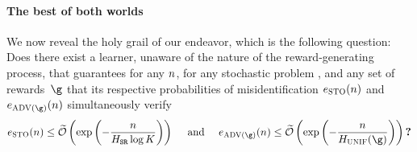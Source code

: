 \paragraph{The best of both worlds} We now reveal the holy grail of our endeavor, which is the following question: Does there exist 
a learner, unaware of the nature of the reward-generating process, that guarantees for any  $n$, for any stochastic problem 
\stoPro{}, and any set of rewards~$\gainVector$ that 
 its respective probabilities 
of misidentification $e_{\textsc{STO}}(n) $ and
$\ProErr_{\advPro(\gainVector)}(\timeHorizon) $ simultaneously verify 
\[
\ProErr_{\stoPro}(\timeHorizon) 
\leq
\tcO\left(\exp\left(-\frac{\timeHorizon}{\complexitySR\log\nArms}\right)\right)
\text{ ~~~and~~~ }
\ProErr_{\advPro(\gainVector)}(\timeHorizon) 
\leq  
\tcO
\left(\exp\left(-\frac{\timeHorizon}{\complexityUnif(\gainVector)}\right)\right)\textbf{?}
\]
%
